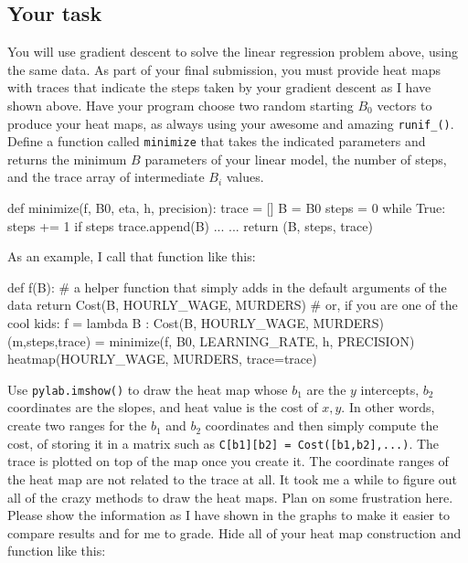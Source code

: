 \begin{fullwidth}
\section{Your task}

You will use gradient descent to solve the linear regression problem above, using the same data. As part of your final submission, you must provide heat maps with traces that indicate the steps taken by your gradient descent as I have shown above.  Have your program choose two random starting $B_0$ vectors to produce your heat maps, as always using your awesome and amazing {\tt runif\_()}.   Define a function called {\tt minimize} that takes the indicated parameters and returns the minimum $B$ parameters of your linear model, the number of steps, and the trace array of intermediate $B_i$ values.

\begin{pyverbatim}
def minimize(f, B0, eta, h, precision):
    trace = []
    B = B0
    steps = 0 
    while True:
        steps += 1
        if steps %
            trace.append(B)
        ...     
    ... 
    return (B, steps, trace)
\end{pyverbatim}

As an example, I call that function like this:

\begin{pyverbatim}
def f(B): # a helper function that simply adds in the default arguments of the data
    return Cost(B, HOURLY_WAGE, MURDERS)
# or, if you are one of the cool kids:
f = lambda B : Cost(B, HOURLY_WAGE, MURDERS)
(m,steps,trace) = minimize(f, B0, LEARNING_RATE, h, PRECISION)
heatmap(HOURLY_WAGE, MURDERS, trace=trace)
\end{pyverbatim}

Use {\tt pylab.imshow()} to draw the heat map whose $b_1$ are the $y$ intercepts, $b_2$ coordinates are the slopes, and heat value is the cost of $x,y$.  In other words, create two ranges for the $b_1$ and $b_2$ coordinates and then simply compute the cost, of storing it in a matrix such as {\tt C[b1][b2] = Cost([b1,b2],...)}.  The trace is plotted on top of the map once you create it. The coordinate ranges of the heat map are not related to the trace at all. It took me a while to figure out all of the crazy methods to draw the heat maps.  Plan on some frustration here.  Please show the information as I have shown in the graphs to make it easier to compare results and for me to grade. Hide all of your heat map construction and function like this:


\end{fullwidth}
